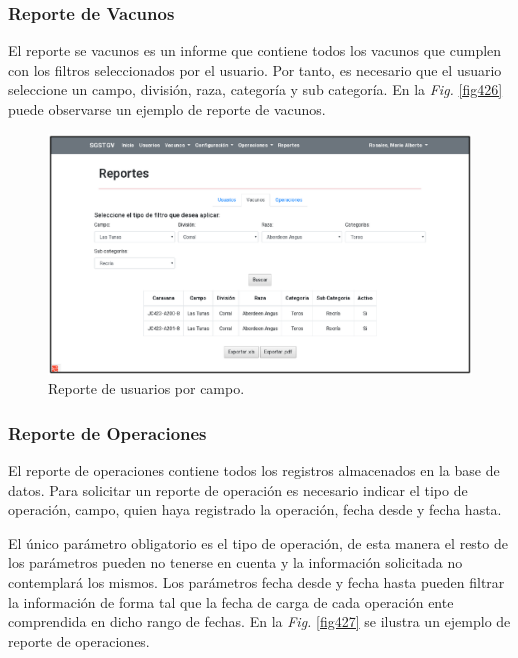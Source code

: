 \documentclass[11pt,oneside]{book}
\begin{document}
\newpage
\subsubsection{Reporte de Vacunos}
El reporte se vacunos es un informe que contiene todos los vacunos que cumplen con los filtros seleccionados por el usuario. Por tanto, es necesario que el usuario seleccione un campo, división, raza, categoría y sub categoría. En la \textit{Fig.} \eqref{fig426} puede observarse un ejemplo de reporte de vacunos.
\begin{figure}[tbhp]
\centerline{\includegraphics[scale=0.87]{figs/capitulo_3_desarrollo/fig426.pdf}}
\caption{Reporte de usuarios por campo.}
\label{fig426}
\end{figure}

\subsubsection{Reporte de Operaciones}
El reporte de operaciones contiene todos los registros almacenados en la base de datos. Para solicitar un reporte de operación es necesario indicar el tipo de operación, campo, quien haya registrado la operación, fecha desde y fecha hasta.

El único parámetro obligatorio es el tipo de operación, de esta manera el resto de los parámetros pueden no tenerse en cuenta y la información solicitada no contemplará los mismos. Los parámetros fecha desde y fecha hasta pueden filtrar la información de forma tal que la fecha de carga de cada operación ente comprendida en dicho rango de fechas. En la \textit{Fig.} \eqref{fig427} se ilustra un ejemplo de reporte de operaciones.
\end{document}
